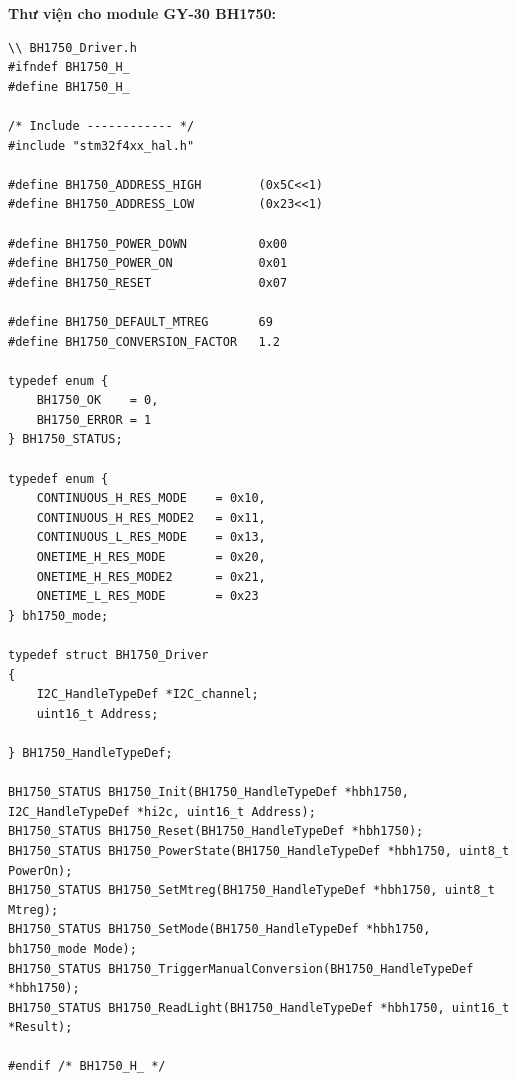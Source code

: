 \textbf{Thư viện cho module GY-30 BH1750:}
\begin{lstlisting}
\\ BH1750_Driver.h
#ifndef BH1750_H_
#define BH1750_H_

/* Include ------------ */
#include "stm32f4xx_hal.h"

#define BH1750_ADDRESS_HIGH        (0x5C<<1)
#define BH1750_ADDRESS_LOW         (0x23<<1)

#define BH1750_POWER_DOWN          0x00
#define BH1750_POWER_ON            0x01
#define BH1750_RESET               0x07

#define BH1750_DEFAULT_MTREG       69
#define BH1750_CONVERSION_FACTOR   1.2

typedef enum {
    BH1750_OK    = 0,
    BH1750_ERROR = 1
} BH1750_STATUS;

typedef enum {
    CONTINUOUS_H_RES_MODE    = 0x10,
    CONTINUOUS_H_RES_MODE2   = 0x11,
    CONTINUOUS_L_RES_MODE    = 0x13,
    ONETIME_H_RES_MODE       = 0x20,
    ONETIME_H_RES_MODE2      = 0x21,
    ONETIME_L_RES_MODE       = 0x23
} bh1750_mode;

typedef struct BH1750_Driver
{
    I2C_HandleTypeDef *I2C_channel;
    uint16_t Address;

} BH1750_HandleTypeDef;

BH1750_STATUS BH1750_Init(BH1750_HandleTypeDef *hbh1750, I2C_HandleTypeDef *hi2c, uint16_t Address);
BH1750_STATUS BH1750_Reset(BH1750_HandleTypeDef *hbh1750);
BH1750_STATUS BH1750_PowerState(BH1750_HandleTypeDef *hbh1750, uint8_t PowerOn);
BH1750_STATUS BH1750_SetMtreg(BH1750_HandleTypeDef *hbh1750, uint8_t Mtreg);
BH1750_STATUS BH1750_SetMode(BH1750_HandleTypeDef *hbh1750, bh1750_mode Mode);
BH1750_STATUS BH1750_TriggerManualConversion(BH1750_HandleTypeDef *hbh1750);
BH1750_STATUS BH1750_ReadLight(BH1750_HandleTypeDef *hbh1750, uint16_t *Result);

#endif /* BH1750_H_ */
\end{lstlisting}

